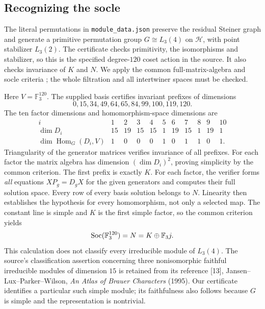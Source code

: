 \subsection{Recognizing the socle}
The literal permutations in \texttt{module\_data.json} preserve the residual Steiner graph and generate a primitive
permutation group $G\cong L_3(4)$ on $\mathcal H$, with point stabilizer
$L_3(2)$. The certificate checks primitivity, the isomorphisms and stabilizer, so this is
the specified degree-$120$ coset action in the source. It also checks
invariance of $K$ and $N$. We apply the common full-matrix-algebra and socle criteria \cite[Theorems~6.2--6.3]{U}; the whole filtration and all intertwiner spaces must be checked.

Here $V=\mathbb F_3^{120}$. The supplied basis certifies invariant prefixes
of dimensions
\[
0,15,34,49,64,65,84,99,100,119,120.
\]
The ten factor dimensions and homomorphism-space dimensions are
\[
\begin{array}{c|rrrrrrrrrr}
i&1&2&3&4&5&6&7&8&9&10\\\hline
\dim D_i&15&19&15&15&1&19&15&1&19&1\\
\dim\operatorname{Hom}_G(D_i,V)&1&0&0&0&1&0&1&1&0&1.
\end{array}
\]
Triangularity of the generator matrices verifies invariance of all prefixes.
For each factor the matrix algebra has dimension $(\dim D_i)^2$, proving
simplicity by the common criterion. The first prefix is exactly $K$.
For each factor, the verifier forms \emph{all} equations
$XP_g=D_gX$ for the given generators and computes their full solution space.
Every row of every basis solution belongs to $N$. Linearity then establishes
the hypothesis for every homomorphism, not only a selected map.
The constant line is simple and $K$ is the first simple factor, so
the common criterion yields
\[
 \operatorname{Soc}(\mathbb F_3^{120})=N=K\oplus\mathbb F_3j.
\]
This calculation does not classify every irreducible module of $L_3(4)$.
The source's classification assertion concerning three nonisomorphic faithful
irreducible modules of dimension $15$ is retained from its reference [13], Jansen--Lux--Parker--Wilson, \emph{An Atlas of Brauer Characters} (1995).
Our certificate identifies a particular such simple module; its faithfulness
also follows because $G$ is simple and the representation is nontrivial.

